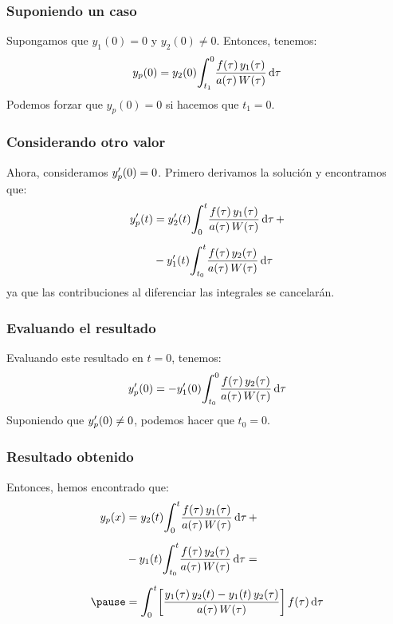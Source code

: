 \documentclass[12pt]{beamer}
\begin{document}
\begin{frame}
\frametitle{Suponiendo un caso}
Supongamos que $y_{1} (0) = 0$ y $y_{2} (0) \neq 0$. \pause Entonces, tenemos:
\pause
\begin{align}
y_{p} (0) = y_{2} (0) \scaleint{6ex}_{\bs t_{1}}^{0} \dfrac{f (\tau) \, y_{1} (\tau)}{a (\tau) \, W (\tau)} \dd{\tau}
\label{eq:ecuacion_07_16}
\end{align}
\pause
Podemos forzar que $y_{p} (0) = 0$ si hacemos que $t_{1} = 0$.
\end{frame}
\begin{frame}
\frametitle{Considerando otro valor}
Ahora, consideramos ${y}^{\prime}_{p} (0) = 0$. \pause Primero derivamos la solución y encontramos que:
\pause
\begin{eqnarray}
\begin{aligned}
\pderivada{y}_{p} (t) &= \pderivada{y}_{2} (t) \scaleint{6ex}_{\bs 0}^{t} \dfrac{f (\tau) \, y_{1} (\tau)}{a (\tau) \, W (\tau)} \dd{\tau} + \\[0.5em]
&- \pderivada{y}_{1} (t) \scaleint{6ex}_{\bs t_{0}}^{t} \dfrac{f (\tau) \, y_{2} (\tau)}{a (\tau) \, W (\tau)} \dd{\tau}
\end{aligned}
\label{eq:ecuacion_07_17}
\end{eqnarray}
ya que las contribuciones al diferenciar las integrales se cancelarán.
\end{frame}
\begin{frame}
\frametitle{Evaluando el resultado}
Evaluando este resultado en $t = 0$, tenemos:
\pause
\begin{align}
\pderivada{y}_{p} (0) = - \pderivada{y}_{1} (0) \scaleint{6ex}_{\bs t_{0}}^{0} \dfrac{f (\tau) \, y_{2} (\tau)}{a (\tau) \, W (\tau)} \dd{\tau}
\label{eq:ecuacion_07_18}
\end{align}
Suponiendo que ${y}^{\prime}_{p} (0) \neq 0$, podemos hacer que $t_{0} = 0$.
\end{frame}
\begin{frame}
\frametitle{Resultado obtenido}
Entonces, hemos encontrado que:
\pause
\begin{eqnarray}
\begin{aligned}[b]
y_{p} (x) &= y_{2} (t) \scaleint{6ex}_{\bs 0}^{t} \dfrac{f (\tau) \, y_{1} (\tau)}{a (\tau) \, W (\tau)} \dd{\tau} + \\[0.5em]
&- y_{1} (t) \scaleint{6ex}_{\bs t_{0}}^{t} \dfrac{f (\tau) \, y_{2} (\tau)}{a (\tau) \, W (\tau)} \dd{\tau} = \\[0.5em] \pause
&= \scaleint{6ex}_{\bs 0}^{t} \bigg[ \dfrac{y_{1} (\tau) \, y_{2} (t) - y_{1} (t) \, y_{2} (\tau)}{a (\tau) \, W (\tau)} \bigg] \, f (\tau) \dd{\tau}
\end{aligned}
\label{eq:ecuacion_07_19}
\end{eqnarray}
\end{frame}
\end{document}
